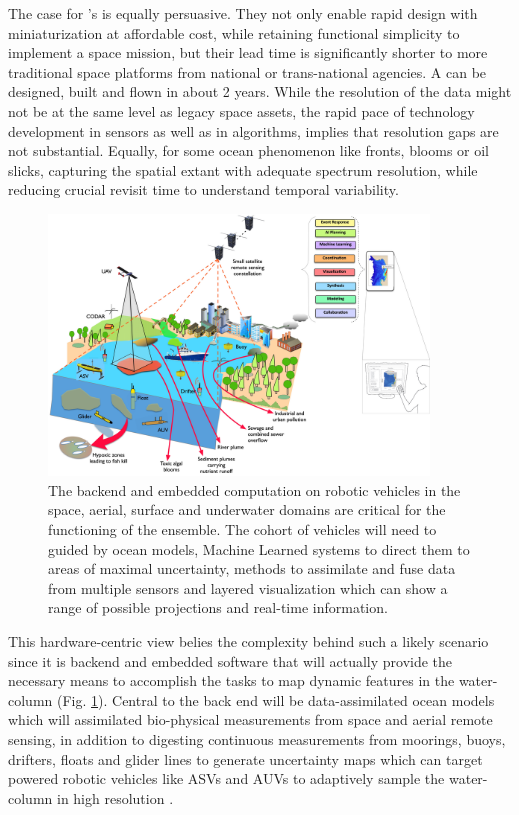 The case for \smle 's is equally persuasive. They not only enable
rapid design with miniaturization at affordable cost, while retaining
functional simplicity to implement a space mission, but their lead
time is significantly shorter to more traditional space platforms from
national or trans-national agencies. A \sml can be designed, built and
flown in about 2 years. While the resolution of the data might not be
at the same level as legacy space assets, the rapid pace of technology
development in sensors as well as in algorithms, implies that
resolution gaps are not substantial. Equally, for some ocean
phenomenon like fronts, blooms or oil slicks, capturing the spatial
extant with adequate spectrum resolution, while reducing crucial
revisit time to understand temporal variability.



\begin{figure}[!h]
  \centering
  \includegraphics[width=0.9\textwidth]{fig/inverse-pyramid-2.jpg}
  \caption{The backend and embedded computation on robotic vehicles in
  the space, aerial, surface and underwater domains are critical for
  the functioning of the ensemble. The cohort of vehicles will need to
  guided by ocean models, Machine Learned systems to direct them to
  areas of maximal uncertainty, methods to assimilate and fuse data
  from multiple sensors and layered visualization which can show a
  range of possible projections and real-time information.}
  \label{fig:inverse-2}
\end{figure}

This hardware-centric view belies the complexity behind such a likely
scenario since it is backend and embedded software that will actually
provide the necessary means to accomplish the tasks to map dynamic
features in the water-column (Fig. \ref{fig:inverse-2}). Central to
the back end will be data-assimilated ocean models which will
assimilated bio-physical measurements from space and aerial remote
sensing, in addition to digesting continuous measurements from
moorings, buoys, drifters, floats and glider lines to generate
uncertainty maps which can target powered robotic vehicles like ASVs
and AUVs to adaptively sample the water-column in high resolution
\cite{berget18,fossum18,fossum18b,fossum19b,fossum21}.

